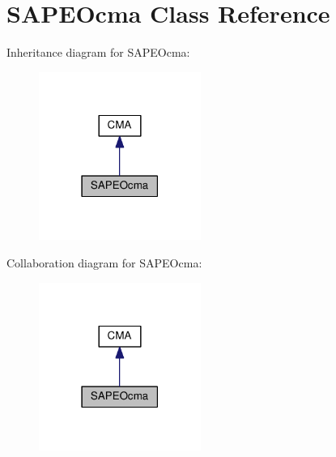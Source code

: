 \hypertarget{classSAPEOcma}{}\section{S\+A\+P\+E\+Ocma Class Reference}
\label{classSAPEOcma}


Inheritance diagram for S\+A\+P\+E\+Ocma\+:\nopagebreak
\begin{figure}[H]
\begin{center}
\leavevmode
\includegraphics[width=150pt]{classSAPEOcma__inherit__graph}
\end{center}
\end{figure}


Collaboration diagram for S\+A\+P\+E\+Ocma\+:\nopagebreak
\begin{figure}[H]
\begin{center}
\leavevmode
\includegraphics[width=150pt]{classSAPEOcma__coll__graph}
\end{center}
\end{figure}
